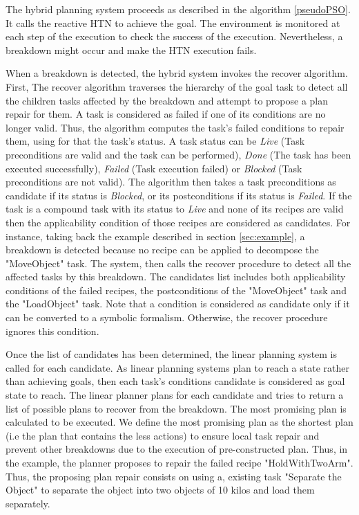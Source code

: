 \documentclass[conference]{IEEEtran}
\begin{document}
	\par The hybrid planning system proceeds as described in the algorithm  \ref{pseudoPSO}. It calls the reactive HTN  to achieve the goal. The environment is monitored at each step of the execution to check the success of the execution. Nevertheless, a breakdown might occur and make the  HTN execution fails. 
	\par When a breakdown is detected, the hybrid system invokes the recover algorithm. First, The recover algorithm traverses the hierarchy of the goal task to detect all the children tasks affected by the breakdown and attempt to propose a plan repair for them. A task is considered as failed if one of its conditions are no longer valid. Thus, the algorithm computes the task's failed conditions to repair them, using for that the task's status. A task status can be \textit{Live} (Task preconditions are valid and the task can be performed), \textit{ Done} (The task has been executed successfully),  \textit{Failed} (Task execution failed) or \textit{Blocked}  (Task preconditions are not valid). The algorithm then takes a task preconditions as candidate if its status is  \textit{Blocked}, or its postconditions if its status is \textit{Failed}. If the task is a compound task with its status to \textit{Live} and none of its recipes are valid then the applicability condition of those recipes are considered as candidates. For instance, taking back the example described in  section \ref{sec:example}, a breakdown is detected because no recipe can be applied to decompose the "MoveObject" task. The system, then calls the recover procedure to detect all the affected tasks by this breakdown. The candidates list includes both applicability conditions of the failed recipes, the postconditions of the "MoveObject" task and the "LoadObject" task.
	Note that a condition is considered as candidate only if it can be converted to a symbolic formalism. Otherwise, the recover procedure ignores this condition. 	
	\par Once the list of candidates has been determined, the linear planning system is called for each candidate. As linear planning systems plan to reach a state rather than achieving goals, then each task's conditions candidate is considered as goal state to reach.  The linear planner plans  for each candidate and tries to return a list of possible plans to recover from the breakdown. The most promising plan is calculated to be executed. We define the most promising plan as the shortest plan (i.e the plan that contains the less actions) to ensure local task repair and prevent other breakdowns due to the execution of pre-constructed plan. Thus, in the example, the planner proposes to repair the failed recipe "HoldWithTwoArm". Thus, the proposing plan repair consists on using a, existing task "Separate the Object" to separate the object into two objects of 10 kilos and load them separately.
	
\end{document}
